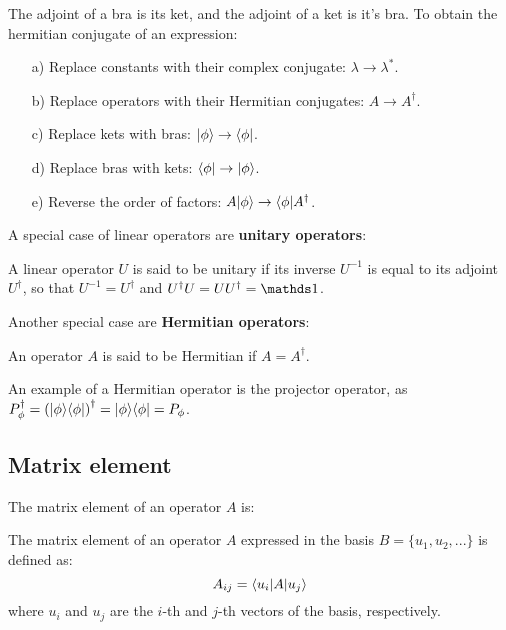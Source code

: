 \begin{itemize}
\begin{enumerate}
    \end{enumerate}
    The adjoint of a bra is its ket, and the adjoint of a ket is it's bra.
    To obtain the hermitian conjugate of an expression:
    \begin{enumerate}
        \item[a)] Replace constants with their complex conjugate: $\lambda \to \lambda^*$.
        \item[b)] Replace operators with their Hermitian conjugates: $A\to A^\dagger$.
        \item[c)] Replace kets with bras: $|\phi\rangle\to\langle\phi|$.
        \item[d)] Replace bras with kets: $\langle\phi|\to|\phi\rangle$.
        \item[e)] Reverse the order of factors: $A|\phi\rangle \to \langle\phi|A^\dagger$.

    \end{enumerate}
\end{itemize}

A special case of linear operators are \textbf{unitary operators}:

\begin{definition}
    A linear operator $U$ is said to be unitary if its inverse $U^{-1}$ is equal to its adjoint $U^\dagger$, so that $U^{-1} = U^\dagger$ and $U^\dagger U = UU^\dagger = \Imat$.
\end{definition}

Another special case are \textbf{Hermitian operators}:

\begin{definition}
    An operator $A$ is said to be Hermitian if $A = A^\dagger$.
\end{definition}

An example of a Hermitian operator is the projector operator, as $P_\phi^\dagger = \left(|\phi\rangle\langle\phi|\right)^\dagger = |\phi\rangle\langle\phi| = P_\phi$.

\subsection{Matrix element}

The matrix element of an operator $A$ is:
\begin{definition}
    The matrix element of an operator $A$ expressed in the basis $B = \{u_1, u_2, ...\}$ is defined as:
    \begin{equation}
        A_{ij} = \langle u_i|A|u_j\rangle
    \end{equation}
    where $u_i$ and $u_j$ are the $i$-th and $j$-th vectors of the basis, respectively.
\end{definition}

